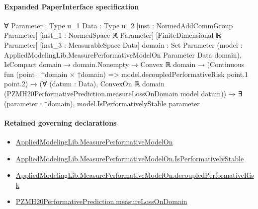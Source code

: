 \documentclass[10pt]{article}
\begin{document}
\paragraph{Expanded PaperInterface specification}
\begin{ReviewVerbatim}
∀ {Parameter : Type u_1} {Data : Type u_2} [inst : NormedAddCommGroup Parameter] [inst_1 : NormedSpace ℝ Parameter]
  [FiniteDimensional ℝ Parameter] [inst_3 : MeasurableSpace Data] {domain : Set Parameter}
  (model : AppliedModelingLib.MeasurePerformativeModelOn Parameter Data domain),
  IsCompact domain →
    domain.Nonempty →
      Convex ℝ domain →
        (Continuous fun (point : ↑domain × ↑domain) => model.decoupledPerformativeRisk point.1 point.2) →
          (∀ (datum : Data), ConvexOn ℝ domain (PZMH20PerformativePrediction.measureLossOnDomain model datum)) →
            ∃ (parameter : ↑domain), model.IsPerformativelyStable parameter
\end{ReviewVerbatim}

\paragraph{Retained governing declarations}
\begin{itemize}\raggedright
\item \hyperlink{library-prerequisite-e14cc5e8b1e1460e}{Applied\allowbreak{}Modeling\allowbreak{}Lib.\allowbreak{}Measure\allowbreak{}Performative\allowbreak{}Model\allowbreak{}On}
\item \hyperlink{library-prerequisite-4af6c70f954a80a0}{Applied\allowbreak{}Modeling\allowbreak{}Lib.\allowbreak{}Measure\allowbreak{}Performative\allowbreak{}Model\allowbreak{}On.\allowbreak{}Is\allowbreak{}Performatively\allowbreak{}Stable}
\item \hyperlink{library-prerequisite-25221c4f931beacb}{Applied\allowbreak{}Modeling\allowbreak{}Lib.\allowbreak{}Measure\allowbreak{}Performative\allowbreak{}Model\allowbreak{}On.\allowbreak{}decoupled\allowbreak{}Performative\allowbreak{}Risk}
\item \hyperlink{governing-declaration-64e41a12da3cadaf}{PZMH20\allowbreak{}Performative\allowbreak{}Prediction.\allowbreak{}measure\allowbreak{}Loss\allowbreak{}On\allowbreak{}Domain}
\end{itemize}
\end{document}
